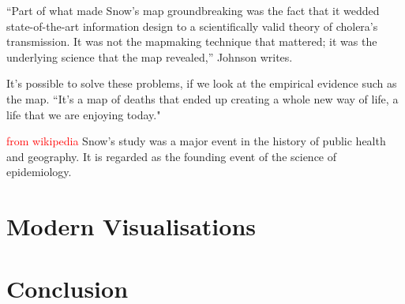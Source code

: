 \documentclass[12pt]{article}
\newcommand\todo[1]{\textcolor{red}{#1}}
\begin{document}
“Part of what made Snow’s map groundbreaking was the fact that it wedded state-of-the-art information design to a scientifically valid theory of cholera’s transmission. It was not the mapmaking technique that mattered; it was the underlying science that the map revealed,” Johnson writes. \cite{history}

It's possible to solve these problems, if we look at the empirical evidence such as the map. ``It's a  map of deaths that ended up creating a whole new way of life, a life that we are enjoying today." \cite{tedtalk}

\todo{from wikipedia}
Snow's study was a major event in the history of public health and geography. It is regarded as the founding event of the science of epidemiology.


\section{Modern Visualisations}

\section{Conclusion}


% 
% 




\end{document}
